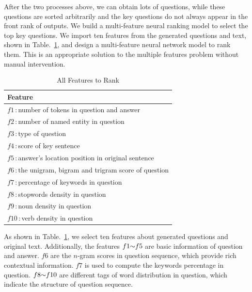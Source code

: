 \documentclass[runningheads,UTF8,article]{comsis2}
\begin{document}
	After the two processes above, we can obtain lots of questions, while these questions are sorted arbitrarily and the key questions do not always appear in the front rank of outputs. We build a multi-feature neural ranking model to select the top key questions. We import ten features from the generated questions and text, shown in Table.~\ref{features}, and design a multi-feature neural network model to rank them. This is an appropriate solution to the multiple features problem without manual intervention. 
	\begin{table}[!th]
		\centering
		\caption{All Features to Rank}
		\label{features}
		\setlength\tabcolsep{0.5em}
		\begin{tabular}{|p{200pt}|}
			\hline
			\textbf{Feature} \\
			\hline
			$ f1 $\,:\,number of tokens in question and answer\\ 
			$ f2 $\,:\,number of named entity in question \\   
			$ f3 $\,:\,type of question \\ 
			$ f4 $\,:\,score of key sentence  \\ 
			$ f5 $\,:\,answer's location position in original sentence  \\ 
			$ f6 $\,:\,the unigram, bigram and trigram score of question\\     			
			$ f7 $\,:\,percentage of keywords in question \\
			$ f8 $\,:\,stopwords density in question\\	
			$ f9 $\,:\,noun density in question\\
			$ f10 $\,:\,verb density in question \\
			\hline 
		\end{tabular}	
	\end{table}
	
	
	
	
	
	As shown in Table.~\ref{features}, we select ten features about generated questions and original text.
	Additionally, the features $f1
	\scriptsize{\sim}f5$ are basic information of question and answer. $f6$ are the $n$-gram scores in question sequence, which provide rich contextual information. $f7$ is used to compute the keywords percentage in question. $ f8 \scriptsize{\sim}f10$ are different tags of word distribution in question, which indicate the structure of question sequence.
	
\end{document}
